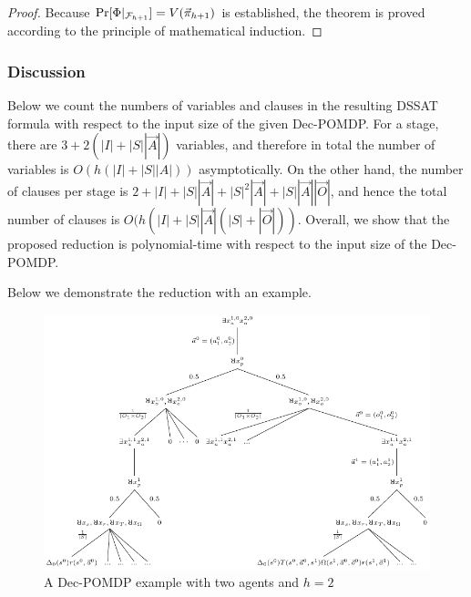 \begin{proof}
    Because $\Pr[\Phi|_{\mathcal{F}_{h+1}}]=V(\vec{\pi}_{h+1})$ is established,
    the theorem is proved according to the principle of mathematical induction.
\end{proof}

\subsubsection{Discussion}
Below we count the numbers of variables and clauses in the resulting DSSAT formula with respect to the input size of the given Dec-POMDP.
For a stage,
there are $3+2(|I|+|S||\vec{A}|)$ variables,
and therefore in total the number of variables is $O(h(|I|+|S||A|))$ asymptotically.
On the other hand,
the number of clauses per stage is $2+|I|+|S||\vec{A}|+|S|^2|\vec{A}|+|S||\vec{A}||\vec{O}|$,
and hence the total number of clauses is $O(h(|I|+|S||\vec{A}|(|S|+|\vec{O}|))$.
Overall, we show that the proposed reduction is polynomial-time with respect to the input size of the Dec-POMDP.

Below we demonstrate the reduction with an example.

\begin{figure}[t]
    \centering
    \includegraphics{fig/build/dssat-dec-pomdp-example.pdf}
    \caption{A Dec-POMDP example with two agents and $h=2$}
    \label{fig:dssat-dec-pomdp-example}
\end{figure}

